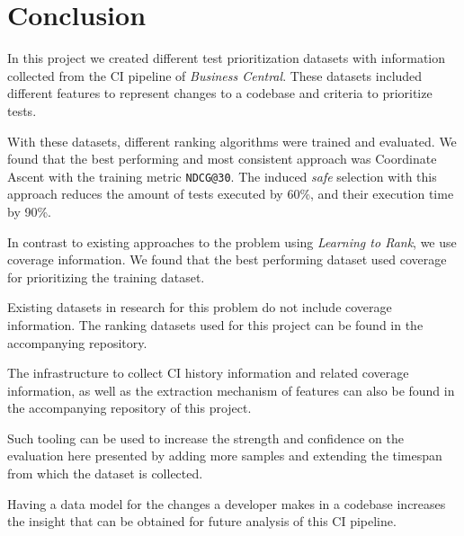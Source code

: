 \chapter{Conclusion}

In this project we created different test prioritization datasets with 
information collected from the CI pipeline of \emph{Business Central}. These datasets included
different features to represent changes to a codebase and criteria to prioritize tests.

With these datasets, different ranking algorithms were trained and evaluated. We
found that the best performing and most consistent approach was Coordinate Ascent
with the training metric \texttt{NDCG@30}. The induced \emph{safe} selection with
this approach reduces the amount of tests executed by 60\%, and their execution time 
by 90\%.

In contrast to existing approaches to the problem using \emph{Learning to Rank},
we use coverage information. We found that the best performing dataset
used coverage for prioritizing the training dataset. 

Existing datasets in research for this problem do not include 
coverage information. The ranking datasets used for this project 
can be found in the accompanying repository. 

The infrastructure to collect CI history information and related coverage information,
as well as the extraction mechanism of features can also be found in the accompanying 
repository of this project.

Such tooling can be used to increase the strength and confidence on the 
evaluation here presented by adding more samples and extending 
the timespan from which the dataset is collected. 

Having a data model for the changes a developer makes in a codebase increases
the insight that can be obtained for future analysis of this CI pipeline.

%